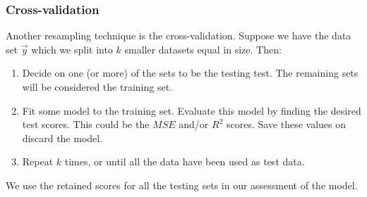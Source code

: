 \subsubsection{Cross-validation}\label{sec:k_fold}
Another resampling technique is the cross-validation. Suppose we have the data set $\vec{y}$ which we split into $k$ smaller datasets equal in size. Then:
\begin{enumerate}
    \item Decide on one (or more) of the sets to be the testing test. The remaining sets will be considered the training set.
    \item Fit some model to the training set. Evaluate this model by finding the desired test scores. This could be the $MSE$ and/or $R^2$ scores. Save these values on discard the model. 
    \item Repeat $k$ times, or until all the data have been used as test data. 
\end{enumerate}
We use the retained scores for all the testing sets in our assessment of the model. 
